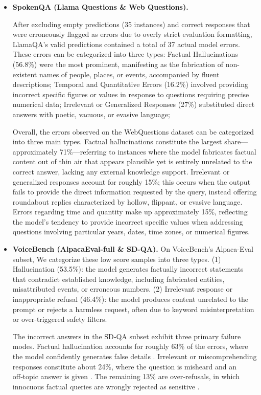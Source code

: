 \documentclass{article}
\begin{document}
\begin{itemize}[leftmargin=0.5em,label=\textbullet,itemsep=0.35em,topsep=0.35em]
    \item \textbf{SpokenQA (Llama Questions \& Web Questions).}
    
  After excluding empty predictions (35 instances) and correct responses that were erroneously flagged as errors due to overly strict evaluation formatting, LlamaQA’s valid predictions contained a total of 37 actual model errors. These errors can be categorized into three types: Factual Hallucinations (56.8\%) were the most prominent, manifesting as the fabrication of non-existent names of people, places, or events, accompanied by fluent descriptions; Temporal and Quantitative Errors (16.2\%) involved providing incorrect specific figures or values in response to questions requiring precise numerical data; Irrelevant or Generalized Responses (27\%) substituted direct answers with poetic, vacuous, or evasive language; 

  Overall, the errors observed on the WebQuestions dataset can be categorized into three main types.
  Factual hallucinations constitute the largest share—approximately 71\%—referring to instances where the model fabricates factual content out of thin air that appears plausible yet is entirely unrelated to the correct answer, lacking any external knowledge support. Irrelevant or generalized responses account for roughly 15\%; this occurs when the output fails to provide the direct information requested by the query, instead offering roundabout replies characterized by hollow, flippant, or evasive language. Errors regarding time and quantity make up approximately 15\%, reflecting the model's tendency to provide incorrect specific values when addressing questions involving particular years, dates, time zones, or numerical figures.
   

  

    \item \textbf{VoiceBench (AlpacaEval-full \& SD-QA).}
  On VoiceBench's Alpaca-Eval subset, We categorize these low score samples into three types. (1) Hallucination (53.5\%): the model generates factually incorrect statements that contradict established knowledge, including fabricated entities, misattributed events, or erroneous numbers. (2) Irrelevant response or inappropriate refusal (46.4\%): the model produces content unrelated to the prompt or rejects a harmless request, often due to keyword misinterpretation or over-triggered safety filters. 
  
  The  incorrect answers in the SD‑QA subset exhibit three primary failure modes. Factual hallucination accounts for roughly 63\% of the errors, where the model confidently generates false details . Irrelevant or miscomprehending responses constitute about 24\%, where the question is misheard and an off‑topic answer is given . The remaining 13\% are over‑refusals, in which innocuous factual queries are wrongly rejected as sensitive .



\end{itemize}
\end{document}
